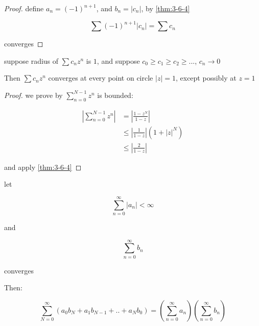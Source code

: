 \begin{proof}
    define $a_n = (-1)^{n+1}$, and $b_n = \lvert c_n \rvert $, by \autoref{thm:3-6-4}

    \[
        \sum (-1)^{n+1} \lvert c_n \rvert = \sum  c_n
    \]

    converges
\end{proof}


\begin{thm}
    suppose radius of $\sum c_n z^n$ is $1$, and suppose 
    $c_0 \ge c_1 \ge c_2 \ge ... $, $c_n \to 0$

    Then $\sum c_n z^n$ converges at every point on circle $\lvert z \rvert = 1$,
    except possibly at $z = 1$
\end{thm}

\begin{proof}
   we prove by $\sum_{n=0}^{N-1}z^n$ is bounded:

   \begin{align*}
    \left| \sum_{n=0}^{N-1}z^n \right| &= \left| \frac{1-z^N}{1-z} \right| \\
    & \le \left|\frac{1}{1-z} \right| \left( 1 + \left| z\right|^N\right) \\
    & \le \left|\frac{2}{1-z} \right|
   \end{align*}

   and apply \autoref{thm:3-6-4}
\end{proof}

\begin{thm}
    let

    \[
        \sum_{n=0}^{\infty} \lvert a_n \rvert < \infty
    \]

    and

    \[
        \sum_{n=0}^{\infty} b_n
    \]

    converges

    Then:

    \[
        \sum_{N=0}^{\infty}(a_0b_N + a_1b_{N-1} + .. + a_Nb_0) = \left(\sum_{n=0}^{\infty} a_n \right)\left(\sum_{n=0}^{\infty} b_n \right)
    \]
\end{thm}

